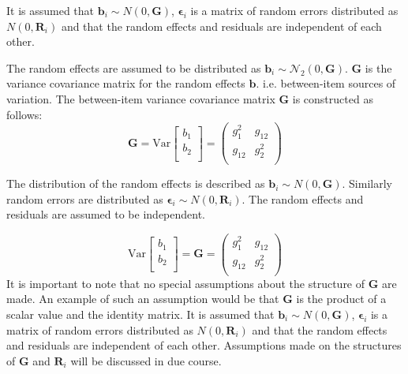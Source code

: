 \documentclass[12pt, a4paper]{report}
\theoremstyle{plain}
\theoremstyle{definition}
\theoremstyle{remark}
\begin{document}
It is assumed that $\boldsymbol{b}_i \sim N(0,\boldsymbol{G})$, $\boldsymbol{\epsilon}_i$ is a matrix of random errors distributed as $N(0,\boldsymbol{R}_i)$ and that the random effects and residuals are 
independent of each other.

The random effects are assumed to be distributed as $\boldsymbol{b}_i \sim \mathcal{N}_2(0,\boldsymbol{G})$. 	$\boldsymbol{G}$ is the variance covariance matrix for the random effects $\boldsymbol{b}$.
i.e. between-item sources of variation. The between-item variance covariance matrix $\boldsymbol{G}$ is constructed as follows:
\[ \boldsymbol{G} = \mbox{Var}  \left[
\begin{array}{c}
b_1   \\
b_2  \\
\end{array}
\right] =  \left(
\begin{array}{cc}
g^2_1  & g_{12} \\
g_{12} & g^2_2 \\
\end{array}
\right) \]

The distribution of the random effects is described as $\boldsymbol{b}_i \sim N(0,\boldsymbol{G})$. Similarly  random errors are distributed as $\boldsymbol{\epsilon}_i \sim N(0,\boldsymbol{R}_i)$. The random effects and residuals are assumed to be independent. 

\[ \mbox{Var}  \left[
\begin{array}{c}
b_1   \\
b_2  \\
\end{array}
\right] =  \boldsymbol{G} =\left(
\begin{array}{cc}
g^2_1  & g_{12} \\
g_{12} & g^2_2 \\
\end{array}
\right) \]
It is important to note that no special assumptions about the structure of $\boldsymbol{G}$ are made. An example of such an assumption would be that $\boldsymbol{G}$ is the product of a scalar value and the identity matrix.
\bigskip
It is assumed that $\boldsymbol{b}_i \sim N(0,\boldsymbol{G})$,
$\boldsymbol{\epsilon}_i$ is a matrix of random errors distributed as $N(0,\boldsymbol{R}_i)$ and
that the random effects and residuals are independent of each other. Assumptions made on the structures of $\boldsymbol{G}$ and $\boldsymbol{R}_i$ will be discussed in due course.

\bigskip
\end{document}
